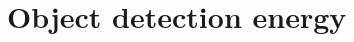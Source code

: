 \begin{comment}
    L_u(\mathbf{u}, \mu^i_u,\Sigma^i_u) &= \frac{1}{
      1 + e^{-k_u(1 - (\mathbf{u} - \mu^i_u)^\top\Sigma^i_u(\mathbf{u} -
      \mu^i_u))}
    }
    \\
    L_{\lambda}(\mathbf{u}, \lambda; \mu^i_d) &= \frac{1}{
    1 + e^{-k_d(\lambda - \mu^i_d(\mathbf{u}))}
  }
  \end{align}
  where 
  \begin{align}
    \mu_u^i &= \projectionOf{\pos{i}{t-1}} \label{eq:muiudef}\\
    \Sigma_u^i &= \projectionOf{\Sigma_i} \label{eq:sigmauidef}\\
    \mu^i_d(\mathbf{u}) &= \relp{i}{t}\\
    k_u &= 10\log(49)\\
    k_d &= \frac{\log(49)}{\sqrt{h^2 + l^2 + w^2}}
    \label{eq:ptransmissionInit}
  \end{align}
  is the distance of the centre of the TP from the camera.


  The association probability becomes

  \begin{multline}
    \assocP = 
      \sech^4\left(\frac{k}{2}\dishort\right)
      (\max \{ 0, \nabla k\dishort^\top\ray \})^2\\
    \prod_i \Lu
      \Llambda \\
      \label{eq:assocCoeffEval}
  \end{multline}

  So the energy becomes

  \begin{multline}
    \label{eq:integrand}
    \Energy{track}(.) = 
      \sum_{i = 1}^N
      \sum_{j = 1}^{M}
      \int_1^{\infty}
      \assocP
      \Ereproj(\lambda)
      d\lambda
  \end{multline}
  where $x = \lambda \ray$ and $\Ereproj(\lambda) = \|\trackpj{t} -
  f^i_{reproj}(\trackpj{t-1}, \lambda)\|^2$ is reprojection error which is a
  quadratic in $\lambda$

  The integral in the above expression is computed numerically.
\end{comment}

\section{Object detection energy}

